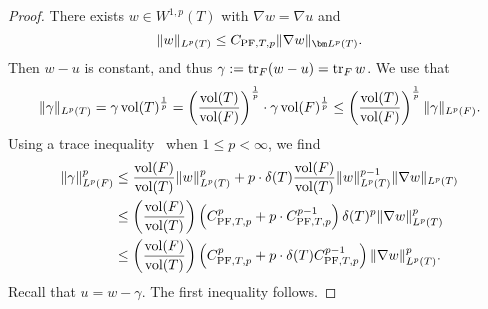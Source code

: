 \documentclass[a4paper]{article}
\begin{document}
\begin{proof}
    There exists $w \in W^{1,p}(T)$ with $\nabla w = \nabla u$ and 
    \[
        \| w \|_{L^{p}(T)}
        \leq 
        C_{{\rm PF},T,p} 
        \| \nabla w \|_{\bfL^{p}(T)}
        .
    \]
    Then $w-u$ is constant, and thus $\gamma := \operatorname{tr}_{F} (w-u) = \operatorname{tr}_{F} w$. 
    We use that 
    \[
        \| \gamma \|_{L^{p}(T)}
        =
        \gamma \operatorname{vol}(T)^\frac{1}{p}
        =
        \left( \frac{ \operatorname{vol}(T) }{ \operatorname{vol}(F) } \right)^\frac{1}{p}
        \cdot 
        \gamma 
        \operatorname{vol}(F)^\frac{1}{p}
        \leq 
        \left( \frac{ \operatorname{vol}(T) }{ \operatorname{vol}(F) } \right)^\frac{1}{p}
        \| \gamma \|_{L^{p}(F)}
        .
    \]
    Using a trace inequality~\cite[Lemma~2.8]{veeser2012poincare} when $1 \leq p < \infty$, we find 
    \begin{align*}
        \| \gamma \|_{L^{p}(F)}^{p}
        &
        \leq 
        \frac{ \operatorname{vol}(F) }{ \operatorname{vol}(T) }
        \| w \|_{L^{p}(T)}^{p}
        +
        p
        \cdot 
        {\delta}(T)
        \frac{ \operatorname{vol}(F) }{ \operatorname{vol}(T) }
        \| w \|_{L^{p}(T)}^{p-1}
        \| \nabla w \|_{L^{p}(T)}
        \\&
        \leq 
        \left( \frac{ \operatorname{vol}(F) }{ \operatorname{vol}(T) } \right)
        \left( C_{{\rm PF},T,p}^{p} + p \cdot C_{{\rm PF},T,p}^{p-1} \right) 
        {\delta}(T)^{p}
        \| \nabla w \|_{L^{p}(T)}^{p}
        \\&
        \leq 
        \left( \frac{ \operatorname{vol}(F) }{ \operatorname{vol}(T) } \right)
        \left( C_{{\rm PF},T,p}^{p} + p \cdot {\delta}(T) C_{{\rm PF},T,p}^{p-1} \right) 
        \| \nabla w \|_{L^{p}(T)}^{p}
        .
    \end{align*}
    Recall that $u = w - \gamma$. The first inequality follows. 
    

\end{proof}
\end{document}
